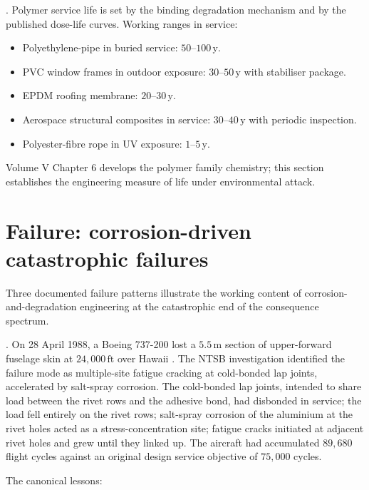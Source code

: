 . Polymer service life is set by the
binding degradation mechanism and by the published dose-life curves.
Working ranges in service:

\begin{itemize}[leftmargin=*]
\item Polyethylene-pipe in buried service: $50$--$100\,\text{y}$.
\item PVC window frames in outdoor exposure: $30$--$50\,\text{y}$
  with stabiliser package.
\item EPDM roofing membrane: $20$--$30\,\text{y}$.
\item Aerospace structural composites in service: $30$--$40\,\text{y}$
  with periodic inspection.
\item Polyester-fibre rope in UV exposure: $1$--$5\,\text{y}$.
\end{itemize}

Volume V Chapter 6 develops the polymer family chemistry; this
section establishes the engineering measure of life under
environmental attack.

\section{Failure: corrosion-driven catastrophic failures}

Three documented failure patterns illustrate the working content of
corrosion-and-degradation engineering at the catastrophic end of the
consequence spectrum.

. On 28 April 1988, a Boeing 737-200 lost a
$5.5\,\text{m}$ section of upper-forward fuselage skin at $24{,}000\,
\text{ft}$ over Hawaii \cite{acc:ntsb-aar94-04}. The NTSB
investigation identified the failure mode as multiple-site fatigue
cracking at cold-bonded lap joints, accelerated by salt-spray
corrosion. The cold-bonded lap joints, intended to share load between
the rivet rows and the adhesive bond, had disbonded in service; the
load fell entirely on the rivet rows; salt-spray corrosion of the
aluminium at the rivet holes acted as a stress-concentration site;
fatigue cracks initiated at adjacent rivet holes and grew until they
linked up. The aircraft had accumulated $89{,}680$ flight cycles
against an original design service objective of $75{,}000$ cycles.

The canonical lessons:

